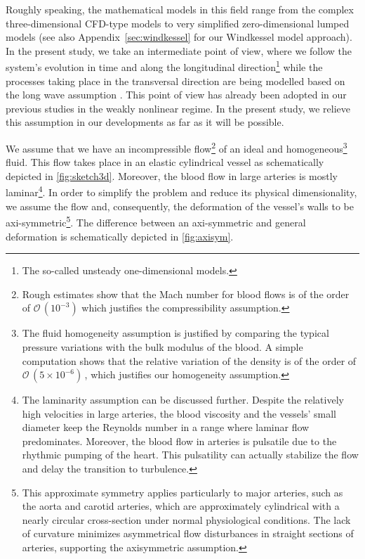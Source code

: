 \documentclass[alpha-refs, 12pt]{wiley-article}
\renewcommand{\O}{\mathcal{O}}
\begin{document}
Roughly speaking, the mathematical models in this field range from the complex three-dimensional CFD-type models \cite{Roe2005} to very simplified zero-dimensional lumped models \cite{Milisic2004, Alastruey2008} (see also Appendix~\ref{sec:windkessel} for our Windkessel model approach). In the present study, we take an intermediate point of view, where we follow the system's evolution in time and along the longitudinal direction\footnote{The so-called unsteady one-dimensional models.} \cite{Sherwin2003, Alastruey2011} while the processes taking place in the transversal direction are being modelled based on the long wave assumption \cite{Lavrentiev1947, Serre1956, BCL, Khakimzyanov2019}. This point of view has already been adopted in our previous studies \cite{Mitsotakis2018, Mitsotakis2019} in the weakly nonlinear regime. In the present study, we relieve this assumption in our developments as far as it will be possible.

We assume that we have an incompressible flow\footnote{Rough estimates show that the Mach number for blood flows is of the order of $\O\,(10^{-3})$ which justifies the compressibility assumption.} of an ideal and homogeneous\footnote{The fluid homogeneity assumption is justified by comparing the typical pressure variations with the bulk modulus of the blood. A simple computation shows that the relative variation of the density is of the order of $\O\,(5\times 10^{-6})\,$, which justifies our homogeneity assumption.} fluid. This flow takes place in an elastic cylindrical vessel as schematically depicted in \cref{fig:sketch3d}. Moreover, the blood flow in large arteries is mostly laminar\footnote{The laminarity assumption can be discussed further. Despite the relatively high velocities in large arteries, the blood viscosity and the vessels' small diameter keep the Reynolds number in a range where laminar flow predominates. Moreover, the blood flow in arteries is pulsatile due to the rhythmic pumping of the heart. This pulsatility can actually stabilize the flow and delay the transition to turbulence.}. In order to simplify the problem and reduce its physical dimensionality, we assume the flow and, consequently, the deformation of the vessel's walls to be axi-symmetric\footnote{This approximate symmetry applies particularly to major arteries, such as the aorta and carotid arteries, which are approximately cylindrical with a nearly circular cross-section under normal physiological conditions. The lack of curvature minimizes asymmetrical flow disturbances in straight sections of arteries, supporting the axisymmetric assumption.}. The difference between an axi-symmetric and general deformation is schematically depicted in \cref{fig:axisym}. 
\end{document}
